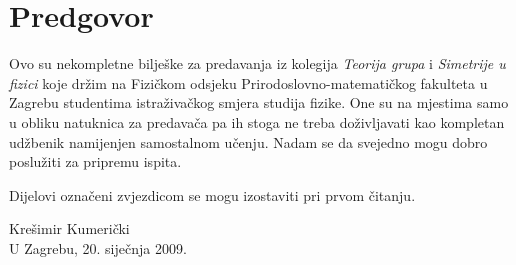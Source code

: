 


\hspace*{10ex}
\section*{Predgovor}

Ovo su nekompletne bilješke za predavanja iz kolegija \emph{Teorija grupa}
i \emph{Simetrije u fizici} koje
držim na Fizičkom odsjeku Prirodoslovno-matematičkog fakulteta u Zagrebu
studentima istraživačkog smjera studija fizike. One su na mjestima samo u obliku
natuknica za predavača pa ih stoga ne
treba doživljavati kao kompletan udžbenik namijenjen samostalnom učenju.
Nadam se da svejedno mogu dobro poslužiti za pripremu ispita.

Dijelovi označeni zvjezdicom se mogu izostaviti pri prvom čitanju.

\begin{flushright}
\begin{minipage}{38ex}
Krešimir Kumerički\\
U Zagrebu, 20. siječnja 2009.
\end{minipage}
\end{flushright}
